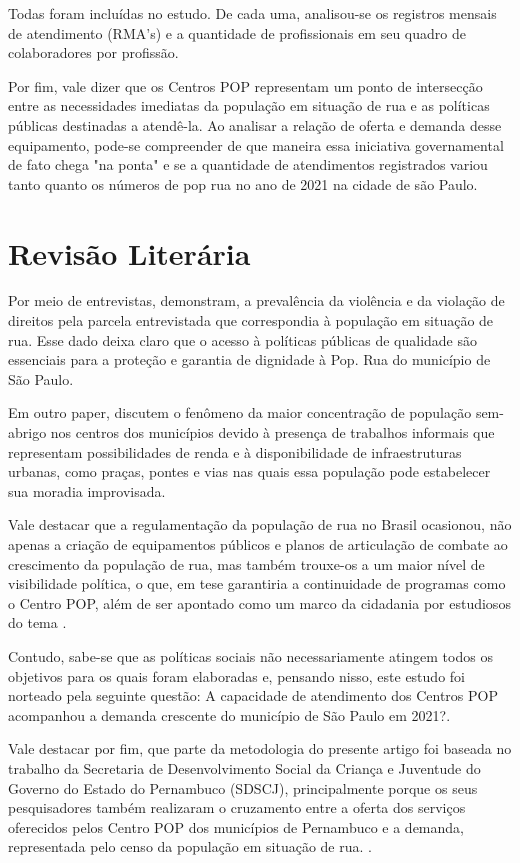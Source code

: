 Todas foram incluídas no estudo. De cada uma, analisou-se os registros mensais de atendimento (RMA's) e a quantidade de profissionais em seu quadro de colaboradores por profissão.

Por fim, vale dizer que os Centros POP representam um ponto de intersecção entre as necessidades imediatas da população em situação de rua e as políticas públicas destinadas a atendê-la. Ao analisar a relação de oferta e demanda desse equipamento, pode-se compreender de que maneira essa iniciativa governamental de fato chega "na ponta" e se a quantidade de atendimentos registrados variou tanto quanto os números de pop rua no ano de 2021 na cidade de são Paulo.

\section{Revisão Literária}

Por meio de entrevistas, \textcite{rauppvulnerab} demonstram, a prevalência da violência e da violação de direitos pela parcela entrevistada que correspondia à população em situação de rua. Esse dado deixa claro que o acesso à políticas públicas de qualidade são essenciais para a proteção e garantia de dignidade à Pop. Rua do município de São Paulo.

Em outro paper, \textcite{serafinocentro} discutem o fenômeno da maior concentração de população sem-abrigo nos centros dos municípios devido à presença de trabalhos informais que representam possibilidades de renda e à disponibilidade de infraestruturas urbanas, como praças, pontes e vias nas quais essa população pode estabelecer sua moradia improvisada.

Vale destacar que a regulamentação da população de rua no Brasil ocasionou, não apenas a criação de equipamentos públicos e planos de articulação de combate ao crescimento da população de rua, mas também trouxe-os a um maior nível de visibilidade política, o que, em tese garantiria a continuidade de programas como o Centro POP, além de ser apontado como um marco da cidadania por estudiosos do tema \cite{medeirosbenesse}.

Contudo, sabe-se que as políticas sociais não necessariamente atingem todos os objetivos para os quais foram elaboradas e, pensando nisso, este estudo foi norteado pela seguinte questão: A capacidade de atendimento dos Centros POP acompanhou a demanda crescente do município de São Paulo em 2021?. 

Vale destacar por fim, que parte da metodologia do presente artigo foi baseada no trabalho da Secretaria de Desenvolvimento Social da Criança e Juventude do Governo do Estado do Pernambuco (SDSCJ), principalmente porque os seus pesquisadores também realizaram o cruzamento entre a oferta dos serviços oferecidos pelos Centro POP dos municípios de Pernambuco e a demanda, representada pelo censo da população em situação de rua.  \cite{secretariaPernambuco}.

